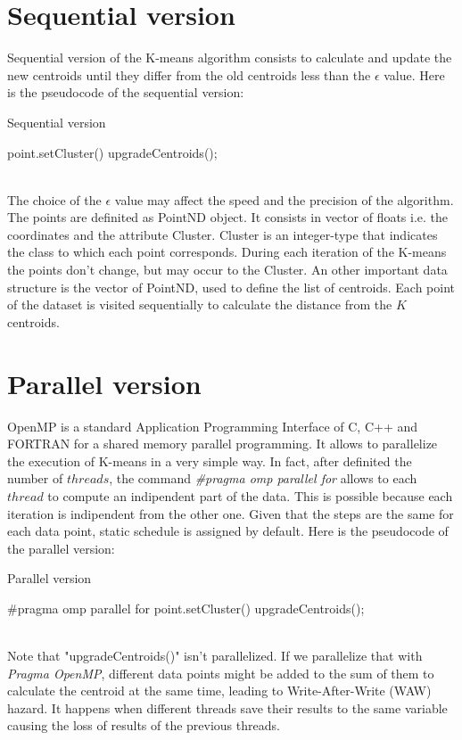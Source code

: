 \documentclass[10pt,twocolumn,letterpaper]{article}
\begin{document}
\section{Sequential version}
Sequential version of the K-means algorithm consists to calculate and update the new centroids until they differ from the old centroids less than the $\epsilon$ value. 
Here is the pseudocode of the sequential version:
\begin{algorithm}
\label{sequenziale}
\caption{Sequential version}
\begin{algorithmic}
			\State point.setCluster()
		\EndFor
    		\State upgradeCentroids();
   	 \EndWhile
\end{algorithmic}
\end{algorithm} 
\\
The choice of the $\epsilon$ value may affect the speed and the precision of the algorithm. The points are definited as PointND object. It consists in vector of floats i.e. the coordinates and the attribute Cluster. Cluster is an integer-type that indicates the class to which each point corresponds. During each iteration of the K-means the points don't change, but may occur to the Cluster. An other important data structure is the vector of PointND, used to define the list of centroids.
Each point of the dataset is visited sequentially to calculate the distance from the $K$ centroids.

\section{Parallel version}
OpenMP  is  a  standard  Application  Programming 
Interface of C, C++ and FORTRAN for a shared memory 
parallel programming. It allows to parallelize the execution of K-means in a very simple way.
In fact, after definited the number of $threads$, the command \emph{\#pragma omp parallel for} allows to each $thread$ to compute an 
indipendent part of the data. This is possible because each iteration is indipendent from the other one.
Given that the steps are the same for each data point, static schedule is assigned by default.
Here is the pseudocode of the parallel version:
\begin{algorithm}
\label{parallelo}
\caption{Parallel version}
\begin{algorithmic}
		\State \#pragma omp parallel for
			\State point.setCluster()
		\EndFor
    		\State upgradeCentroids();
   	 \EndWhile
\end{algorithmic}
\end{algorithm}
\\Note that "upgradeCentroids()" isn't parallelized. If we parallelize that with \emph{Pragma OpenMP}, different data points might be added to the sum of them to calculate the centroid
 at the same time, leading to Write-After-Write (WAW) hazard. It happens when different threads save their results to the same variable causing the loss of results of the previous threads.
\end{document}
